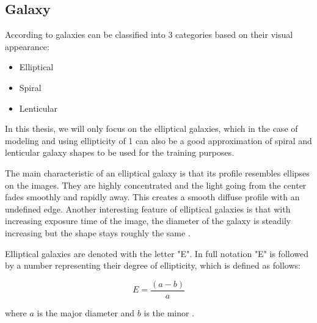 \subsection{Galaxy}
According to \cite{hubble} galaxies can be classified into 3 categories based on their visual appearance:
\begin{itemize}
    \item Elliptical 
    \item Spiral 
    \item Lenticular
\end{itemize}

In this thesis, we will only focus on the elliptical galaxies, which in the case of modeling and using ellipticity of 1 can also be a good approximation of spiral and lenticular galaxy shapes to be used for the training purposes.

The main characteristic of an elliptical galaxy is that its profile resembles ellipses on the images. They are highly concentrated and the light going from the center fades smoothly and rapidly away. This creates a smooth diffuse profile with an undefined edge. Another interesting feature of elliptical galaxies is that with increasing exposure time of the image, the diameter of the galaxy is steadily increasing but the shape stays roughly the same \cite{hubble}.

Elliptical galaxies are denoted with the letter "E". In full notation "E" is followed by a number representing their degree of ellipticity, which is defined as follows: 

\begin{equation}
E = \frac{(a-b)}{a}
\end{equation}

where $a$ is the major diameter and $b$ is the minor \cite{hubble}. 
